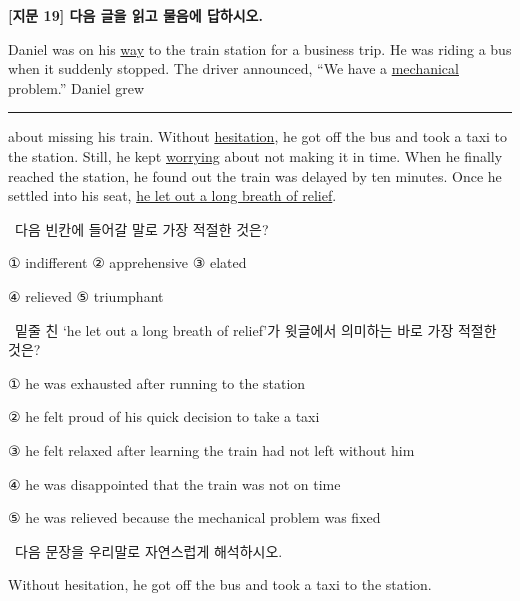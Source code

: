 \documentclass[11pt,a4paper]{article}
\newcommand{\qno}[1]{\par\vspace{8pt}\noindent{\sffamily\bfseries #1.}\ }
\newcommand{\instr}[1]{{\sffamily #1}\par\vspace{3pt}}
\begin{document}
\begin{center}
{\fontsize{15}{17}\selectfont\sffamily\bfseries [지문 19] 다음 글을 읽고 물음에 답하시오.}
\end{center}
\vspace{4pt}

\begin{pbox}
Daniel was on his \underline{way} to the train station for a business trip.
He was riding a bus when it suddenly stopped.
The driver announced, ``We have a \underline{mechanical} problem.''
Daniel grew \rule{2.5cm}{0.4pt} about missing his train.
Without \underline{hesitation}, he got off the bus and took a taxi to the station.
Still, he kept \underline{worrying} about not making it in time.
When he finally reached the station, he found out the train was delayed by ten minutes.
Once he settled into his seat, \underline{he let out a long breath of relief}.
\end{pbox}

\vspace{6pt}

\qno{1}\instr{다음 빈칸에 들어갈 말로 가장 적절한 것은?}
\begin{choices}
\item ① indifferent \hfill ② apprehensive \hfill ③ elated
\item ④ relieved \hfill ⑤ triumphant
\end{choices}

\vspace{6pt}

\qno{2}\instr{밑줄 친 `he let out a long breath of relief'가 윗글에서 의미하는 바로 가장 적절한 것은?}
\begin{choices}
\item ① he was exhausted after running to the station
\item ② he felt proud of his quick decision to take a taxi
\item ③ he felt relaxed after learning the train had not left without him
\item ④ he was disappointed that the train was not on time
\item ⑤ he was relieved because the mechanical problem was fixed
\end{choices}

\vspace{6pt}

\qno{3}\instr{[서술형] 다음 문장을 우리말로 자연스럽게 해석하시오.}

\vspace{4pt}
\begin{pbox}
Without hesitation, he got off the bus and took a taxi to the station.
\end{pbox}
\end{document}
